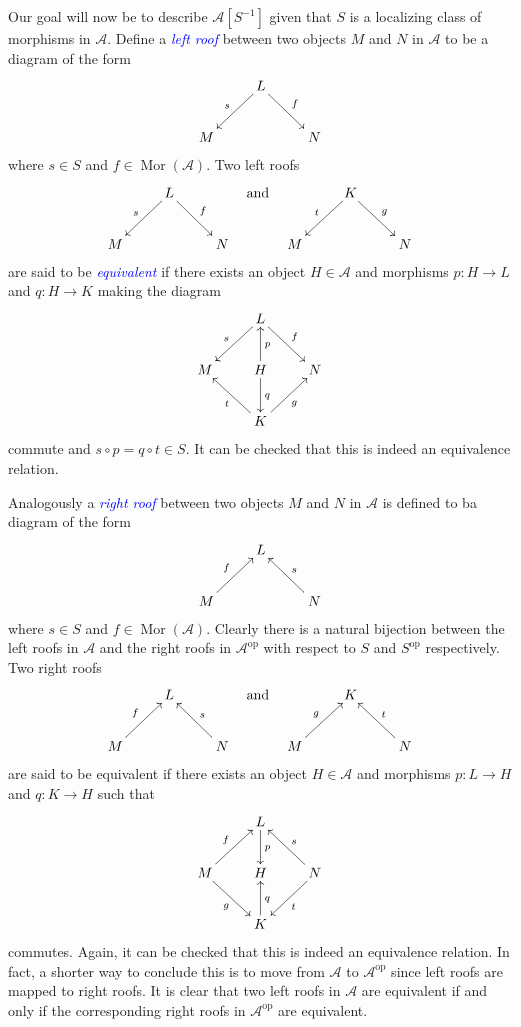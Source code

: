 \documentclass[11pt]{article}
\theoremstyle{thmstyle}
\theoremstyle{defstyle}
\newcommand{\scrA}{\mathscr{A}}
\newcommand{\define}[1]{\textcolor{blue}{\textit{#1}}}
\newcommand{\Mor}{\operatorname{Mor}}
\newcommand{\op}{\mathrm{op}}
\begin{document}
Our goal will now be to describe $\scrA[S^{-1}]$ given that $S$ is a localizing class of morphisms in $\scrA$. Define a \define{left roof} between two objects $M$ and $N$ in $\scrA$ to be a diagram of the form 
\begin{equation*}
	\xymatrix {
		& L\ar[ld]_s\ar[rd]^f & \\
		M & & N
	}
\end{equation*}
where $s\in S$ and $f\in\Mor(\scrA)$. Two left roofs 
\begin{equation*}
	\xymatrix {
		& L\ar[ld]_s\ar[rd]^f & \\
		M & & N
	}
	\quad\text{and}\quad 
	\xymatrix {
		& K\ar[ld]_t\ar[rd]^g & \\
		M & & N
	}
\end{equation*}
are said to be \define{equivalent} if there exists an object $H\in\scrA$ and morphisms $p\colon H\to L$ and $q\colon H\to K$ making the diagram
\begin{equation*}
	\xymatrix {
		& L\ar[ld]_s\ar[rd]^f & \\
		M & H\ar[u]_{p}\ar[d]^{q} & N\\
		& K\ar[lu]^t\ar[ru]_g & 
	}
\end{equation*}
commute and $s\circ p = q\circ t\in S$. It can be checked that this is indeed an equivalence relation.

Analogously a \define{right roof} between two objects $M$ and $N$ in $\scrA$ is defined to ba diagram of the form 
\begin{equation*}
	\xymatrix {
		& L &\\
		M\ar[ru]^f & & N\ar[lu]_s
	}
\end{equation*}
where $s\in S$ and $f\in\Mor(\scrA)$. Clearly there is a natural bijection between the left roofs in $\scrA$ and the right roofs in $\scrA^\op$ with respect to $S$ and $S^\op$ respectively. Two right roofs 
\begin{equation*}
	\xymatrix {
		& L &\\
		M\ar[ru]^f & & N\ar[lu]_s
	}\quad\text{and}\quad
	\xymatrix {
		& K &\\
		M\ar[ru]^g & & N\ar[lu]_t
	}
\end{equation*}
are said to be equivalent if there exists an object $H\in\scrA$ and morphisms $p\colon L\to H$ and $q\colon K\to H$ such that 
\begin{equation*}
	\xymatrix {
		& L\ar[d]^p & \\
		M\ar[ru]^f\ar[rd]_g & H & N\ar[lu]_s\ar[ld]^t\\
		& K\ar[u]_q & 
	}
\end{equation*}
commutes. Again, it can be checked that this is indeed an equivalence relation. In fact, a shorter way to conclude this is to move from $\scrA$ to $\scrA^\op$ since left roofs are mapped to right roofs. It is clear that two left roofs in $\scrA$ are equivalent if and only if the corresponding right roofs in $\scrA^\op$ are equivalent.
\end{document}
